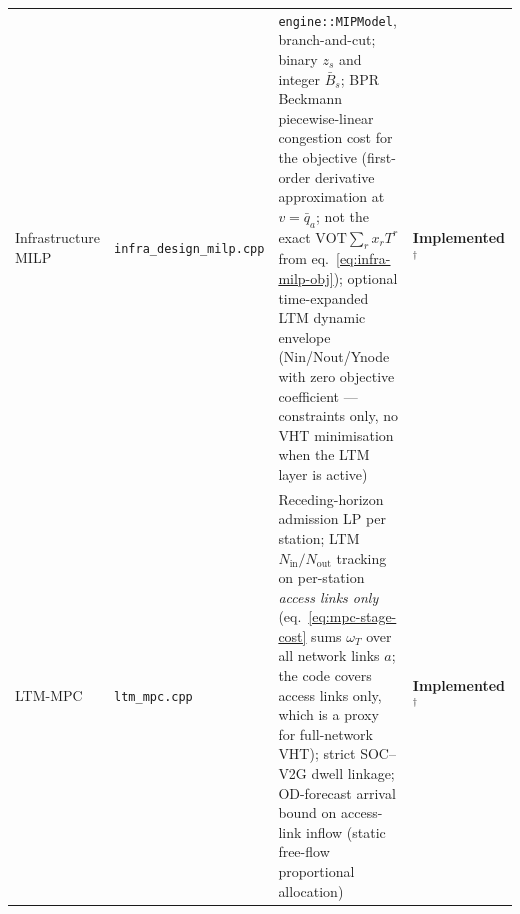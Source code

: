 \begin{table}[htbp]
\begin{tabularx}{\textwidth}{lXXl}
Infrastructure MILP &
  \texttt{infra\_design\_milp.cpp} &
  \texttt{engine::MIPModel}, branch-and-cut;
  binary $z_s$ and integer $\bar{B}_s$;
  BPR Beckmann piecewise-linear congestion cost for the
  objective (first-order derivative approximation at $v=\bar{q}_a$;
  not the exact $\mathrm{VOT}\!\sum_r x_r T^r$ from
  eq.~\eqref{eq:infra-milp-obj});
  optional time-expanded LTM dynamic envelope (Nin/Nout/Ynode with
  zero objective coefficient — constraints only, no VHT
  minimisation when the LTM layer is active) &
  \textbf{Implemented}$^\dagger$ \\
LTM-MPC &
  \texttt{ltm\_mpc.cpp} &
  Receding-horizon admission LP per station;
  LTM $N_{\text{in}}/N_{\text{out}}$ tracking on per-station
  \emph{access links only} (eq.~\eqref{eq:mpc-stage-cost}
  sums $\omega_T$ over all network links $a$; the code covers
  access links only, which is a proxy for full-network VHT);
  strict SOC--V2G dwell linkage;
  OD-forecast arrival bound on access-link inflow
  (static free-flow proportional allocation) &
  \textbf{Implemented}$^\dagger$ \\
\bottomrule
\end{tabularx}
\end{table}

